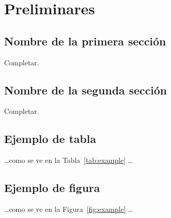 \chapter{Preliminares}\label{chapter03}

\section{Nombre de la primera sección}

Completar.

\section{Nombre de la segunda sección}

Completar.

\section{Ejemplo de tabla}



\noindent \ldots como se ve en la Tabla~\ref{tab:example} \ldots

\section{Ejemplo de figura}



\noindent \ldots como se ve en la Figura~\ref{fig:example} \ldots
